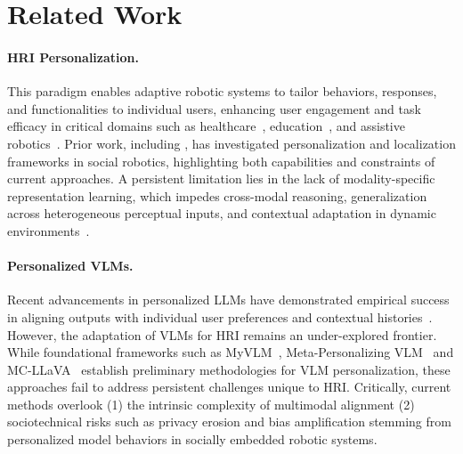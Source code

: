 \section{Related Work}
\paragraph{HRI Personalization.}
This paradigm enables adaptive robotic systems to tailor behaviors, responses, and functionalities to individual users, enhancing user engagement and task efficacy in critical domains such as healthcare~\cite{agrigoroaie2016developing}, education~\cite{irfan2021lifelong}, and assistive robotics~\cite{jevtic2018personalized}. Prior work, including \cite{tanevska2020socially}, has investigated personalization and localization frameworks in social robotics, highlighting both capabilities and constraints of current approaches. A persistent limitation lies in the lack of modality-specific representation learning, which impedes cross-modal reasoning, generalization across heterogeneous perceptual inputs, and contextual adaptation in dynamic environments~\cite{wang2024vlm}.

\paragraph{Personalized VLMs.} Recent advancements in personalized LLMs have demonstrated empirical success in aligning outputs with individual user preferences and contextual histories~\cite{zhuang2024hydra, ning2024user}. However, the adaptation of VLMs for HRI remains an under-explored frontier. While foundational frameworks such as MyVLM~\cite{alaluf2025myvlm}, Meta-Personalizing VLM~\cite{yeh2023meta} and MC-LLaVA~\cite{an2024mc} establish preliminary methodologies for VLM personalization, these approaches fail to address persistent challenges unique to HRI. Critically, current methods overlook (1) the intrinsic complexity of multimodal alignment (2) sociotechnical risks such as privacy erosion and bias amplification stemming from personalized model behaviors in socially embedded robotic systems. %



